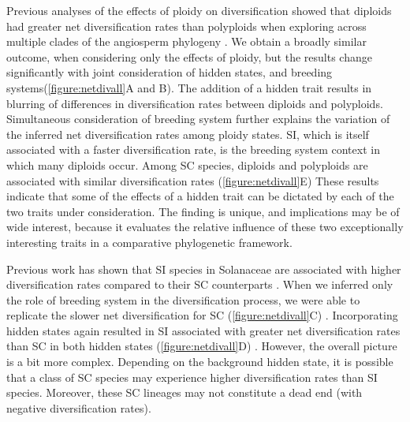 Previous analyses of the effects of ploidy on diversification showed that diploids had greater net diversification rates than polyploids when exploring across multiple clades of the angiosperm phylogeny \citet{mayrose_2011, mayrose_2015}. 
We obtain a broadly similar outcome, when considering only the effects of ploidy, but the results change significantly with joint consideration of hidden states, and breeding systems(\cref{figure:netdivall}A and B). 
The addition of a hidden trait results in blurring of differences in diversification rates between diploids and polyploids. %
Simultaneous consideration of breeding system further explains the variation of the inferred net diversification rates among ploidy states.
SI, which is itself associated with a faster diversification rate, is the breeding system context in which many diploids occur.
Among SC species, diploids and polyploids are associated with similar diversification rates (\cref{figure:netdivall}E) %
These results indicate that some of the effects of a hidden trait can be dictated by  each of the two traits under consideration.
The finding is unique, and implications may be of wide interest, because it evaluates the relative influence of these two exceptionally interesting traits in a comparative phylogenetic framework.

Previous work has shown that SI species in Solanaceae are associated with higher diversification rates compared to their SC counterparts \citep{goldberg_2010}. 
When we inferred only the role of breeding system in the diversification process, we were able to replicate the slower net diversification for SC  (\cref{figure:netdivall}C) .  %
Incorporating hidden states again resulted in SI associated with greater net diversification rates than SC in both hidden states  (\cref{figure:netdivall}D) . 
However, the overall picture is a bit more complex.
Depending on the background hidden state, it is possible that a class of SC species may experience higher diversification rates than SI species.
Moreover, these SC lineages may not constitute a dead end (with negative diversification rates).



